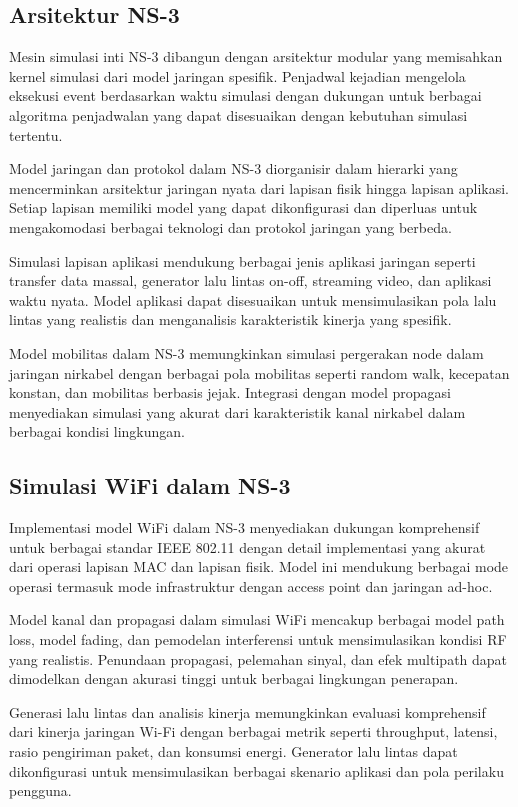 \subsection{Arsitektur NS-3}

Mesin simulasi inti NS-3 dibangun dengan arsitektur modular yang memisahkan kernel simulasi dari model jaringan spesifik. Penjadwal kejadian mengelola eksekusi event berdasarkan waktu simulasi dengan dukungan untuk berbagai algoritma penjadwalan yang dapat disesuaikan dengan kebutuhan simulasi tertentu.

Model jaringan dan protokol dalam NS-3 diorganisir dalam hierarki yang mencerminkan arsitektur jaringan nyata dari lapisan fisik hingga lapisan aplikasi. Setiap lapisan memiliki model yang dapat dikonfigurasi dan diperluas untuk mengakomodasi berbagai teknologi dan protokol jaringan yang berbeda.

Simulasi lapisan aplikasi mendukung berbagai jenis aplikasi jaringan seperti transfer data massal, generator lalu lintas on-off, streaming video, dan aplikasi waktu nyata. Model aplikasi dapat disesuaikan untuk mensimulasikan pola lalu lintas yang realistis dan menganalisis karakteristik kinerja yang spesifik.

Model mobilitas dalam NS-3 memungkinkan simulasi pergerakan node dalam jaringan nirkabel dengan berbagai pola mobilitas seperti random walk, kecepatan konstan, dan mobilitas berbasis jejak. Integrasi dengan model propagasi menyediakan simulasi yang akurat dari karakteristik kanal nirkabel dalam berbagai kondisi lingkungan.

\subsection{Simulasi WiFi dalam NS-3}

Implementasi model WiFi dalam NS-3 menyediakan dukungan komprehensif untuk berbagai standar IEEE 802.11 dengan detail implementasi yang akurat dari operasi lapisan MAC dan lapisan fisik. Model ini mendukung berbagai mode operasi termasuk mode infrastruktur dengan access point dan jaringan ad-hoc.

Model kanal dan propagasi dalam simulasi WiFi mencakup berbagai model path loss, model fading, dan pemodelan interferensi untuk mensimulasikan kondisi RF yang realistis. Penundaan propagasi, pelemahan sinyal, dan efek multipath dapat dimodelkan dengan akurasi tinggi untuk berbagai lingkungan penerapan.

Generasi lalu lintas dan analisis kinerja memungkinkan evaluasi komprehensif dari kinerja jaringan Wi-Fi dengan berbagai metrik seperti throughput, latensi, rasio pengiriman paket, dan konsumsi energi. Generator lalu lintas dapat dikonfigurasi untuk mensimulasikan berbagai skenario aplikasi dan pola perilaku pengguna.


